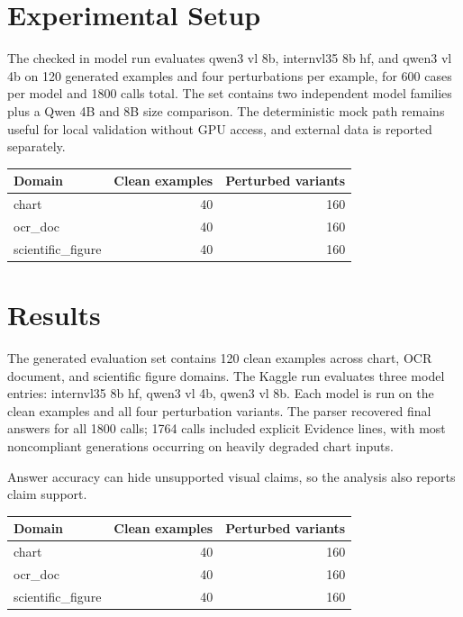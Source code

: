 \documentclass{article}
\begin{document}
\section{Experimental Setup}

The checked in model run evaluates qwen3 vl 8b, internvl35 8b hf, and qwen3 vl 4b on 120 generated examples and four perturbations per example, for 600 cases per model and 1800 calls total. The set contains two independent model families plus a Qwen 4B and 8B size comparison. The deterministic mock path remains useful for local validation without GPU access, and external data is reported separately.

\begin{center}
\begin{tabular}{lrr}
\hline
\textbf{Domain} & \textbf{Clean examples} & \textbf{Perturbed variants} \\
\hline
chart & 40 & 160 \\
ocr\_doc & 40 & 160 \\
scientific\_figure & 40 & 160 \\
\hline
\end{tabular}
\end{center}

\section{Results}

The generated evaluation set contains 120 clean examples across chart, OCR document, and scientific figure domains. The Kaggle run evaluates three model entries: internvl35 8b hf, qwen3 vl 4b, qwen3 vl 8b. Each model is run on the clean examples and all four perturbation variants. The parser recovered final answers for all 1800 calls; 1764 calls included explicit Evidence lines, with most noncompliant generations occurring on heavily degraded chart inputs.

Answer accuracy can hide unsupported visual claims, so the analysis also reports claim support.

\begin{center}
\begin{tabular}{lrr}
\hline
\textbf{Domain} & \textbf{Clean examples} & \textbf{Perturbed variants} \\
\hline
chart & 40 & 160 \\
ocr\_doc & 40 & 160 \\
scientific\_figure & 40 & 160 \\
\hline
\end{tabular}
\end{center}
\end{document}
